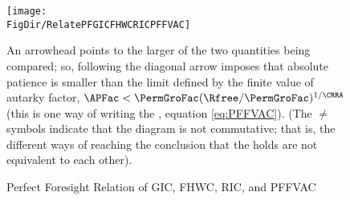 \begin{figure}[ht]
  \centerline{
    \texttt{[image: \\FigDir/RelatePFGICFHWCRICPFFVAC]}
  }
  \caption{Perfect Foresight Relation of {GIC}, {FHWC}, {RIC}, and {PFFVAC}}
  \label{fig:RelatePFGICFHWCRICPFFVAC}
  \footnotesize{An arrowhead points to the larger of the two quantities being compared; so, following the diagonal arrow imposes that absolute patience is smaller than the limit defined by the finite value of autarky factor, $\APFac < \PermGroFac (\Rfree/\PermGroFac)^{1/\CRRA}$ (this is one way of writing the {\PFFVAC}, equation \eqref{eq:PFFVAC}}). (The $\neq$ symbols indicate that the diagram is not commutative; that is, the different ways of reaching the conclusion that the {\PFFVAC} holds are not equivalent to each other).
\end{figure}
